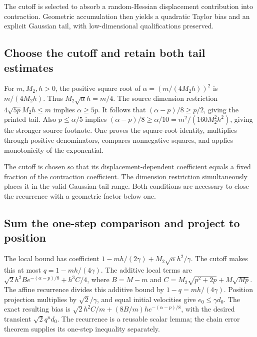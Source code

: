 \documentclass[11pt,a4paper]{report}
\begin{document}
The cutoff is selected to absorb a random-Hessian displacement contribution into contraction. Geometric accumulation then yields a quadratic Taylor bias and an explicit Gaussian tail, with low-dimensional qualifications preserved.

\subsection{\texorpdfstring{Choose the cutoff and retain both tail estimates}{Choose the cutoff and retain both tail estimates}}
\label{report-step-KineticLangevin-SecondOrderRecurrence-lean-1}


For \(m,M_2,h>0\), the positive square root of \(\alpha=(m/(4M_2h))^2\) is \(m/(4M_2h)\). Thus \(M_2\sqrt\alpha h=m/4\). The source dimension restriction \(4\sqrt{5p}M_2h\le m\) implies \(\alpha\ge5p\). It follows that \((\alpha-p)/8\ge p/2\), giving the printed tail. Also \(p\le\alpha/5\) implies \((\alpha-p)/8\ge\alpha/10=m^2/(160M_2^2h^2)\), giving the stronger source footnote. One proves the square-root identity, multiplies through positive denominators, compares nonnegative squares, and applies monotonicity of the exponential.



The cutoff is chosen so that its displacement-dependent coefficient equals a fixed fraction of the contraction coefficient. The dimension restriction simultaneously places it in the valid Gaussian-tail range. Both conditions are necessary to close the recurrence with a geometric factor below one.

\subsection{\texorpdfstring{Sum the one-step comparison and project to position}{Sum the one-step comparison and project to position}}
\label{report-step-KineticLangevin-SecondOrderRecurrence-lean-2}


The local bound has coefficient \(1-mh/(2\gamma)+M_2\sqrt\alpha h^2/\gamma\). The cutoff makes this at most \(q=1-mh/(4\gamma)\). The additive local terms are \(\sqrt2h^2B e^{-(\alpha-p)/8}+h^3C/4\), where \(B=M-m\) and \(C=M_2\sqrt{p^2+2p}+M\sqrt{Mp}\). The affine recurrence divides this additive bound by \(1-q=mh/(4\gamma)\). Position projection multiplies by \(\sqrt2/\gamma\), and equal initial velocities give \(e_0\le\gamma d_0\). The exact resulting bias is \(\sqrt2h^2C/m+(8B/m)h e^{-(\alpha-p)/8}\), with the desired transient \(\sqrt2q^nd_0\). The recurrence is a reusable scalar lemma; the chain error theorem supplies its one-step inequality separately.
\end{document}

